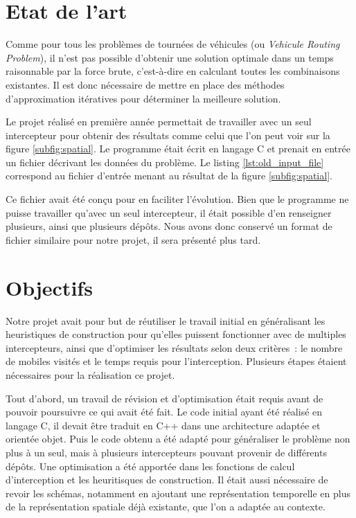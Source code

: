 	\section{Etat de l'art}
		Comme pour tous les problèmes de tournées de véhicules (ou \emph{Vehicule Routing Problem}), il n'est pas possible d'obtenir une solution optimale dans un temps raisonnable par la force brute, c'est-à-dire en calculant toutes les combinaisons existantes. Il est donc nécessaire de mettre en place des méthodes d'approximation itératives pour déterminer la meilleure solution.


		Le projet réalisé en première année permettait de travailler avec un seul intercepteur pour obtenir des résultats comme celui que l'on peut voir sur la figure \ref{subfig:spatial}. Le programme était écrit en langage C et prenait en entrée un fichier décrivant les données du problème. Le listing \ref{lst:old_input_file} correspond au fichier d'entrée menant au résultat de la figure \ref{subfig:spatial}.

		Ce fichier avait été conçu pour en faciliter l'évolution. Bien que le programme ne puisse travailler qu'avec un seul intercepteur, il était possible d'en renseigner plusieurs, ainsi que plusieurs dépôts. Nous avons donc conservé un format de fichier similaire pour notre projet, il sera présenté plus tard.

		\begin{code}
			\label{lst:old_input_file}
		\end{code}

	\section{Objectifs}
		Notre projet avait pour but de réutiliser le travail initial en généralisant les heuristiques de construction pour qu'elles puissent fonctionner avec de multiples intercepteurs, ainsi que d'optimiser les résultats selon deux critères : le nombre de mobiles visités et le temps requis pour l'interception.
		Plusieurs étapes étaient nécessaires pour la réalisation ce projet.

		Tout d'abord, un travail de révision et d'optimisation était requis avant de pouvoir poursuivre ce qui avait été fait. Le code initial ayant été réalisé en langage C, il devait être traduit en C++ dans une architecture adaptée et orientée objet. Puis le code obtenu a été adapté pour généraliser le problème non plus à un seul, mais à plusieurs intercepteurs pouvant provenir de différents dépôts. Une optimisation a été apportée dans les fonctions de calcul d'interception et les heuritisques de construction. Il était aussi nécessaire de revoir les schémas, notamment en ajoutant une représentation temporelle en plus de la représentation spatiale déjà existante, que l'on a adaptée au contexte.

